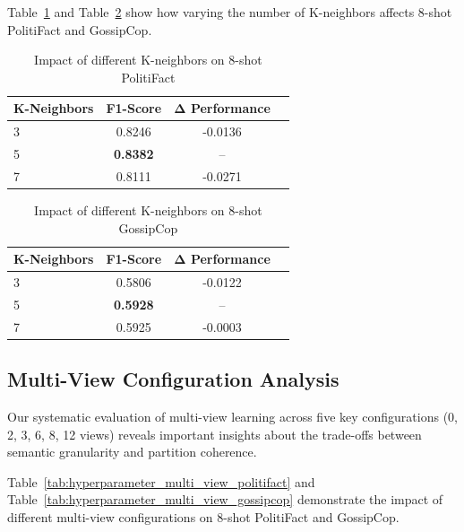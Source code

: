 Table~\ref{tab:hyperparameter_k_neighbors_politifact} and Table~\ref{tab:hyperparameter_k_neighbors_gossipcop} show how varying the number of K-neighbors affects 8-shot PolitiFact and GossipCop.

\begin{table}[htbp]
\centering
\caption{Impact of different K-neighbors on 8-shot PolitiFact}
\label{tab:hyperparameter_k_neighbors_politifact}
\begin{tabular}{lccc}
\toprule
\textbf{K-Neighbors} & \textbf{F1-Score} & \textbf{Δ Performance} \\
\midrule
3 & 0.8246 & -0.0136 \\
5 & \textbf{0.8382} & -- \\
7 & 0.8111 & -0.0271 \\
\bottomrule
\end{tabular}
\end{table}

\begin{table}[htbp]
\centering
\caption{Impact of different K-neighbors on 8-shot GossipCop}
\label{tab:hyperparameter_k_neighbors_gossipcop}
\begin{tabular}{lccc}
\toprule
\textbf{K-Neighbors} & \textbf{F1-Score} & \textbf{Δ Performance} \\
\midrule
3 & 0.5806 & -0.0122 \\
5 & \textbf{0.5928} & -- \\
7 & 0.5925 & -0.0003 \\
\bottomrule
\end{tabular}
\end{table}

\subsection{Multi-View Configuration Analysis}

Our systematic evaluation of multi-view learning across five key configurations (0, 2, 3, 6, 8, 12 views) reveals important insights about the trade-offs between semantic granularity and partition coherence.

Table~\ref{tab:hyperparameter_multi_view_politifact} and Table~\ref{tab:hyperparameter_multi_view_gossipcop}    demonstrate the impact of different multi-view configurations on 8-shot PolitiFact and GossipCop.


